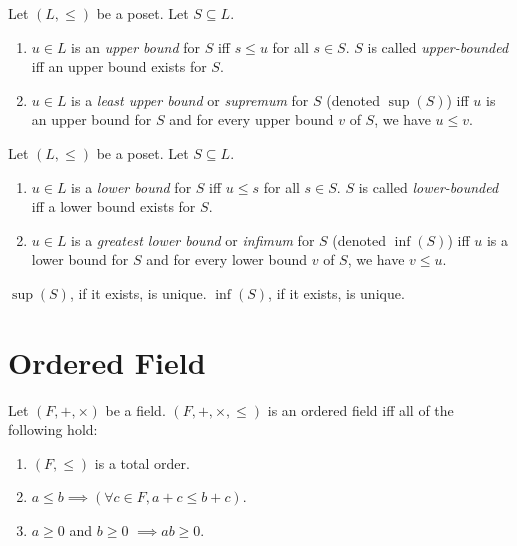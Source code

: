 \documentclass[a4paper, 12pt, fleqn]{article}
\begin{document}
\begin{definition}
Let $(L, \le)$ be a poset. Let $S \subseteq L$.
\begin{enumerate}
\item $u \in L$ is an \emph{upper bound} for $S$ iff $s \le u$ for all $s \in S$.
    $S$ is called \emph{upper-bounded} iff an upper bound exists for $S$.
\item $u \in L$ is a \emph{least upper bound} or \emph{supremum} for $S$ (denoted $\sup(S)$)
    iff $u$ is an upper bound for $S$ and for every upper bound $v$ of $S$, we have $u \le v$.
\end{enumerate}
\end{definition}

\begin{definition}
Let $(L, \le)$ be a poset. Let $S \subseteq L$.
\begin{enumerate}
\item $u \in L$ is a \emph{lower bound} for $S$ iff $u \le s$ for all $s \in S$.
    $S$ is called \emph{lower-bounded} iff a lower bound exists for $S$.
\item $u \in L$ is a \emph{greatest lower bound} or \emph{infimum} for $S$ (denoted $\inf(S)$)
    iff $u$ is a lower bound for $S$ and for every lower bound $v$ of $S$, we have $v \le u$.
\end{enumerate}
\end{definition}

\begin{lemma}
$\sup(S)$, if it exists, is unique.
$\inf(S)$, if it exists, is unique.
\end{lemma}

\section{Ordered Field}

\begin{definition}
\label{defn:ord-field}
Let $(F, +, \times)$ be a field.
$(F, +, \times, \le)$ is an ordered field iff all of the following hold:
\begin{enumerate}
\item $(F, \le)$ is a total order.
\item $a \le b \implies (\forall c \in F, a + c \le b + c)$.
\item $a \ge 0$ and $b \ge 0$ $\implies ab \ge 0$.
\end{enumerate}
\end{definition}
\end{document}

